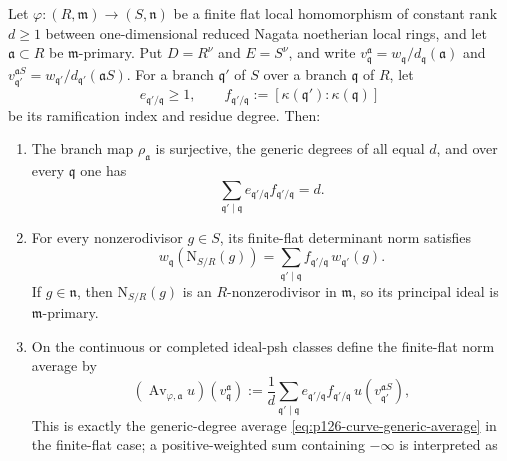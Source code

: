 \begin{theorem}
\label{thm:p126-curve-finite-flat-norm-descent}
Let
\(\varphi:(R,\mathfrak m)\to(S,\mathfrak n)\) be a finite flat local
homomorphism of constant rank \(d\geq1\) between one-dimensional reduced
Nagata noetherian local rings, and let \(\mathfrak a\subset R\) be
\(\mathfrak m\)-primary.  Put \(D=R^\nu\) and \(E=S^\nu\), and write
\(v_{\mathfrak q}^{\mathfrak a}
=w_{\mathfrak q}/d_{\mathfrak q}(\mathfrak a)\) and
\(v_{\mathfrak q'}^{\mathfrak aS}
=w_{\mathfrak q'}/d_{\mathfrak q'}(\mathfrak aS)\).
For a branch \(\mathfrak q'\) of \(S\) over a branch
\(\mathfrak q\) of \(R\), let
\[
 e_{\mathfrak q'/\mathfrak q}\geq1,
 \qquad
 f_{\mathfrak q'/\mathfrak q}
   :=[\kappa(\mathfrak q'): \kappa(\mathfrak q)]
\]
be its ramification index and residue degree.  Then:
\begin{enumerate}
\item The branch map \(\rho_{\mathfrak a}\) is surjective, the generic
      degrees of
       all equal \(d\), and
      over every \(\mathfrak q\) one has
      \[
       \sum_{\mathfrak q'\mid\mathfrak q}
          e_{\mathfrak q'/\mathfrak q}
          f_{\mathfrak q'/\mathfrak q}=d.
       \tag{\(\triangleleft\)}\label{eq:p126-curve-ef-degree}
      \]
\item For every nonzerodivisor \(g\in S\), its finite-flat determinant
      norm satisfies
      \[
       w_{\mathfrak q}\!\left(\mathrm N_{S/R}(g)\right)
          =\sum_{\mathfrak q'\mid\mathfrak q}
             f_{\mathfrak q'/\mathfrak q}\,
             w_{\mathfrak q'}(g).
       \tag{\(\blacktriangle\)}\label{eq:p126-curve-norm-order}
      \]
      If \(g\in\mathfrak n\), then \(\mathrm N_{S/R}(g)\) is an
      \(R\)-nonzerodivisor in \(\mathfrak m\), so its principal ideal is
      \(\mathfrak m\)-primary.
\item On the continuous or completed ideal-psh classes define the
      finite-flat norm average by
      \[
       (\operatorname{Av}_{\varphi,\mathfrak a}u)
          (v_{\mathfrak q}^{\mathfrak a})
       :=\frac1d\sum_{\mathfrak q'\mid\mathfrak q}
          e_{\mathfrak q'/\mathfrak q}
          f_{\mathfrak q'/\mathfrak q}\,
          u(v_{\mathfrak q'}^{\mathfrak aS}),
      \tag{\(\triangleright\)}\label{eq:p126-curve-norm-average}
      \]
      This is exactly the generic-degree average
      \eqref{eq:p126-curve-generic-average} in the finite-flat case; a
      positive-weighted sum containing \(-\infty\) is interpreted as

\end{enumerate}
\end{theorem}
